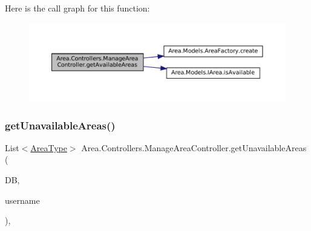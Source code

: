 Here is the call graph for this function\+:
\nopagebreak
\begin{figure}[H]
\begin{center}
\leavevmode
\includegraphics[width=350pt]{classArea_1_1Controllers_1_1ManageAreaController_a04c1155798ffbfc4f87564fe48db8981_cgraph}
\end{center}
\end{figure}
\mbox{\label{classArea_1_1Controllers_1_1ManageAreaController_a17a1989e93097ab54cf340bbfafd7bb3}} 
\subsubsection{\texorpdfstring{get\+Unavailable\+Areas()}{getUnavailableAreas()}}
{\footnotesize\ttfamily List$<$\mbox{\hyperlink{classArea_1_1Models_1_1AreaType}{Area\+Type}}$>$ Area.\+Controllers.\+Manage\+Area\+Controller.\+get\+Unavailable\+Areas (\begin{DoxyParamCaption}\item[{\mbox{\hyperlink{classArea_1_1DAT_1_1AreaDbContext}{Area\+Db\+Context}}}]{DB,  }\item[{string}]{username }\end{DoxyParamCaption})\hspace{0.3cm}{\ttfamily [inline]}, {\ttfamily [private]}}

